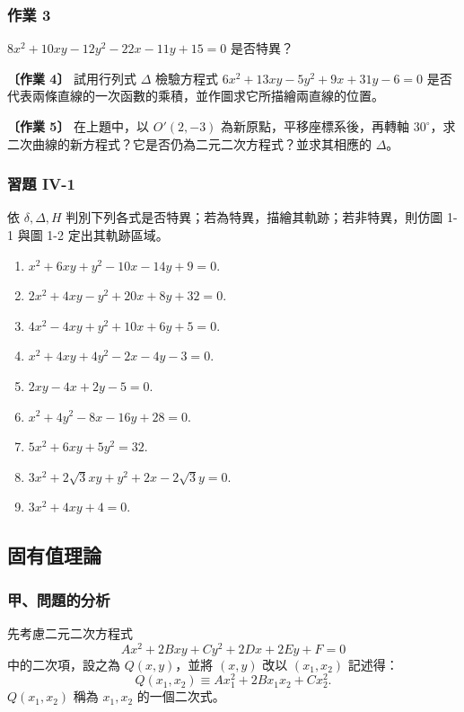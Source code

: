 \subsubsection*{作業 3}
$8x^2 + 10xy - 12y^2 - 22x - 11y + 15 = 0$ 是否特異？

\textbf{〔作業 4〕} 試用行列式 $\Delta$ 檢驗方程式 $6x^2 + 13xy - 5y^2 + 9x + 31y - 6 = 0$ 是否代表兩條直線的一次函數的乘積，並作圖求它所描繪兩直線的位置。

\textbf{〔作業 5〕} 在上題中，以 $O'(2, -3)$ 為新原點，平移座標系後，再轉軸 $30^\circ$，求二次曲線的新方程式？它是否仍為二元二次方程式？並求其相應的 $\Delta$。

\subsubsection*{習題 IV-1}

依 $\delta, \Delta, H$ 判別下列各式是否特異；若為特異，描繪其軌跡；若非特異，則仿圖 1-1 與圖 1-2 定出其軌跡區域。

\begin{enumerate}
  \item $x^2 + 6xy + y^2 - 10x - 14y + 9 = 0$.
  \item $2x^2 + 4xy - y^2 + 20x + 8y + 32 = 0$.
  \item $4x^2 - 4xy + y^2 + 10x + 6y + 5 = 0$.
  \item $x^2 + 4xy + 4y^2 - 2x - 4y - 3 = 0$.
  \item $2xy - 4x + 2y - 5 = 0$.
  \item $x^2 + 4y^2 - 8x - 16y + 28 = 0$.
  \item $5x^2 + 6xy + 5y^2 = 32$.
  \item $3x^2 + 2\sqrt{3}xy + y^2 + 2x - 2\sqrt{3}y = 0$.
  \item $3x^2 + 4xy + 4 = 0$.
\end{enumerate}


\subsection{固有值理論}\label{sec:b4-4-2}

\subsubsection*{甲、\quad 問題的分析}

先考慮二元二次方程式
\[
Ax^2 + 2Bxy + Cy^2 + 2Dx + 2Ey + F = 0
\]
中的二次項，設之為 $Q(x, y)$，並將 $(x, y)$ 改以 $(x_1, x_2)$ 記述得：
\[
Q(x_1, x_2) \equiv Ax_1^2 + 2Bx_1 x_2 + Cx_2^2.
\]
$Q(x_1, x_2)$ 稱為 $x_1, x_2$ 的一個二次式。

